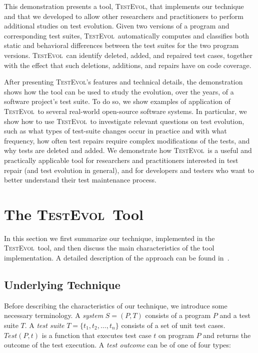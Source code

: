 \documentclass[conference]{IEEEtran}
\newcommand{\mt}{\mathit}
\newcommand{\testfunc}[2]{\mt{Test(#1, #2)}}
\newcommand{\tool}{\textsc{TestEvol}\xspace}
\begin{document}
This demonstration presents a tool, \tool, that implements our
technique and that we developed to allow other researchers and
practitioners to perform additional studies on test evolution. Given
two versions of a program and corresponding test suites, \tool\
automatically computes and classifies both static and behavioral
differences between the test suites for the two program versions.
\tool\ can identify deleted, added, and repaired test cases, together
with the effect that such deletions, additions, and repairs have on
code coverage.

After presenting \tool's features and technical details, the
demonstration shows how the tool can be used to study the evolution,
over the years, of a software project's test suite.  To do so, we show
examples of application of \tool\ to several real-world open-source
software systems. In particular, we show how to use \tool\ to
investigate relevant questions on test evolution, such as what types
of test-suite changes occur in practice and with what frequency, how
often test repairs require complex modifications of the tests, and why
tests are deleted and added. We demonstrate how \tool\ is a useful and
practically applicable tool for researchers and practitioners
interested in test repair (and test evolution in general), and for
developers and testers who want to better understand their test
maintenance process.

\section{The \tool\ Tool}
\label{sec:test-evolution}

In this section we first summarize our technique, implemented in the
\tool\ tool, and then discuss the main characteristics of the tool
implementation. A detailed description of the approach can be found
in~\cite{pinto12}.

\subsection{Underlying Technique}

Before describing the characteristics of our technique, we introduce
some necessary terminology.  A \textit{system} $S = (P, T)$ consists
of a program $P$ and a test suite $T$.  A \textit{test suite} $T =
\{t_1, t_2, \ldots, t_n\}$ consists of a set of unit test cases.
$\testfunc{P}{t}$ is a function that executes test case $t$ on program
$P$ and returns the outcome of the test execution.  A \textit{test
  outcome} can be of one of four types:
\end{document}
